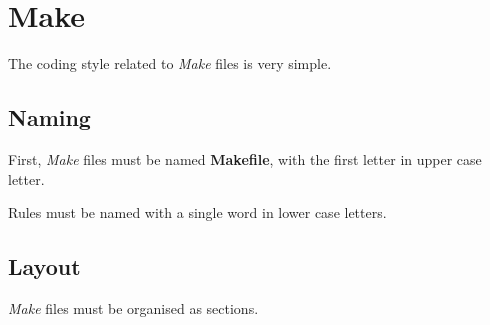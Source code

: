 %
%
%
%
%
%

%
%

\section{Make}
\label{section:make}

The coding style related to \textit{Make} files is very simple.


\subsection{Naming}

First, \textit{Make} files must be named \textbf{Makefile}, with the first
letter in upper case letter.

Rules must be named with a single word in lower case letters.


\subsection{Layout}

\textit{Make} files must be organised as sections.

